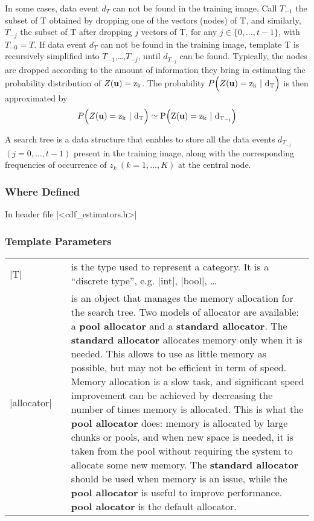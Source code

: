 \documentclass[12pt,twoside]{report}
\newcommand{\mloc}[1]{\rm{\bf #1}}
\begin{document}
In some cases, data event $d_T$ can not be found in the training image. Call $T_{-1}$ the subset of T obtained by dropping one of the vectors (nodes) of T, and similarly, $T_{-j}$ the subset of T after dropping $j$ vectors of T, for any \mbox{$j \in \{ 0,\ldots,t-1 \}$}, with $T_{-0}=T$. If data event $d_T$ can not be found in the training image, template T is recursively simplified into $T_{-1}$,\ldots,$T_{-j}$, until $d_{T_{-j}}$ can be found. Typically, the nodes are dropped according to the amount of information they bring in estimating the probability distribution of $Z(\mloc{u}) = z_k$.
The probability \mbox{$P \Big(Z(\mloc{u}) = z_k \ | \ d_T \Big)$} is then approximated by
\begin{displaymath}
  P \Big(Z(\mloc{u}) = z_k \ | \ d_T \Big) \simeq P \Big(Z(\mloc{u}) = z_k \ | \ d_{T_{-j}} \Big)
\end{displaymath}
\vspace{0.3cm}

A search tree is a data structure that enables to store all the data events $d_{T_{-j}}$ \mbox{$(j=0,\ldots,t-1)$} present in the training image, along with the corresponding frequencies of occurrence of $z_k \ (k=1,\ldots,K)$ at the central node.
\DefineShortVerb{\|}


\htmlrule[CLEAR=all]  \subsubsection*{Where Defined}
In header file |<cdf_estimators.h>|


\htmlrule[CLEAR=all]  \subsubsection*{Template Parameters}
\begin{tabular}[!h]{l l p{10cm}}
|T| & & is the type used to represent a category. It is a ``discrete type'', e.g. |int|, |bool|, \ldots \\
|allocator| & & is an object that manages the memory allocation for the search tree. Two models of allocator are available: a {\bf pool allocator} and a {\bf standard allocator}. The {\bf standard allocator} allocates memory only when it is needed. This allows to use as little memory as possible, but may not be efficient in term of speed. Memory allocation is a slow task, and significant speed improvement can be achieved by decreasing the number of times memory is allocated. This is what the {\bf pool allocator} does: memory is allocated by large chunks or pools, and when new space is needed, it is taken from the pool without requiring the system to allocate some new memory. The {\bf standard allocator} should be used when memory is an issue, while the {\bf pool allocator} is useful to improve performance. {\bf pool alocator} is the default allocator.\\
\end{tabular}
\end{document}
